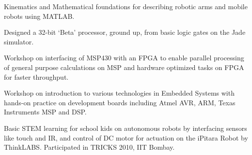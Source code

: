 \documentclass[]{deedy-resume-openfont}
\begin{document}
Kinematics and Mathematical foundations for describing robotic arms and mobile robots using MATLAB.

\sectionsep

 Designed a 32-bit ‘Beta’ processor, ground up, from basic logic gates on the Jade simulator.

\sectionsep

 Workshop on interfacing of MSP430 with an FPGA to enable parallel processing of general purpose calculations on MSP and hardware optimized tasks on FPGA for faster throughput.
\sectionsep

 Workshop on introduction to various technologies in Embedded Systems with	hands-on practice on development boards including Atmel AVR, ARM, Texas Instruments MSP and DSP.

\sectionsep

Basic STEM learning for school kids on autonomous robots by interfacing sensors like touch and IR, and control of DC motor for actuation on the iPitara Robot by ThinkLABS. Participated in TRICKS 2010, IIT Bombay.
\sectionsep




%
%
\end{document}
